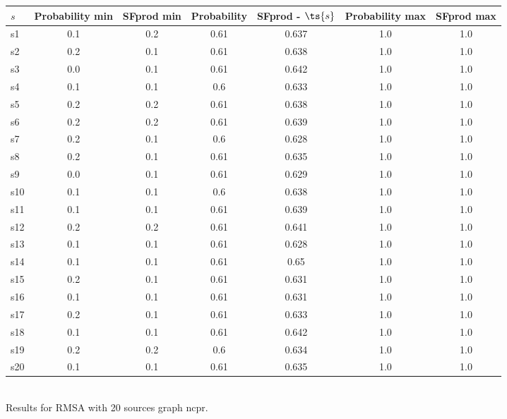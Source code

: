 \documentclass{article}
\begin{document}
\noindent\begin{tabular}{|l|c|c|c|c|c|c|}
\hline
$s$& Probability min & SFprod min & Probability & SFprod - $\ts{s}$ & Probability max & SFprod max\\
\hline
s1 &0.1 & 0.2 & 0.61 & 0.637 & 1.0 & 1.0\\
\hline
s2 &0.2 & 0.1 & 0.61 & 0.638 & 1.0 & 1.0\\
\hline
s3 &0.0 & 0.1 & 0.61 & 0.642 & 1.0 & 1.0\\
\hline
s4 &0.1 & 0.1 & 0.6 & 0.633 & 1.0 & 1.0\\
\hline
s5 &0.2 & 0.2 & 0.61 & 0.638 & 1.0 & 1.0\\
\hline
s6 &0.2 & 0.2 & 0.61 & 0.639 & 1.0 & 1.0\\
\hline
s7 &0.2 & 0.1 & 0.6 & 0.628 & 1.0 & 1.0\\
\hline
s8 &0.2 & 0.1 & 0.61 & 0.635 & 1.0 & 1.0\\
\hline
s9 &0.0 & 0.1 & 0.61 & 0.629 & 1.0 & 1.0\\
\hline
s10 &0.1 & 0.1 & 0.6 & 0.638 & 1.0 & 1.0\\
\hline
s11 &0.1 & 0.1 & 0.61 & 0.639 & 1.0 & 1.0\\
\hline
s12 &0.2 & 0.2 & 0.61 & 0.641 & 1.0 & 1.0\\
\hline
s13 &0.1 & 0.1 & 0.61 & 0.628 & 1.0 & 1.0\\
\hline
s14 &0.1 & 0.1 & 0.61 & 0.65 & 1.0 & 1.0\\
\hline
s15 &0.2 & 0.1 & 0.61 & 0.631 & 1.0 & 1.0\\
\hline
s16 &0.1 & 0.1 & 0.61 & 0.631 & 1.0 & 1.0\\
\hline
s17 &0.2 & 0.1 & 0.61 & 0.633 & 1.0 & 1.0\\
\hline
s18 &0.1 & 0.1 & 0.61 & 0.642 & 1.0 & 1.0\\
\hline
s19 &0.2 & 0.2 & 0.6 & 0.634 & 1.0 & 1.0\\
\hline
s20 &0.1 & 0.1 & 0.61 & 0.635 & 1.0 & 1.0\\
\hline
\end{tabular}\\

\noindent Results for RMSA with 20 sources graph ncpr.
\end{document}
